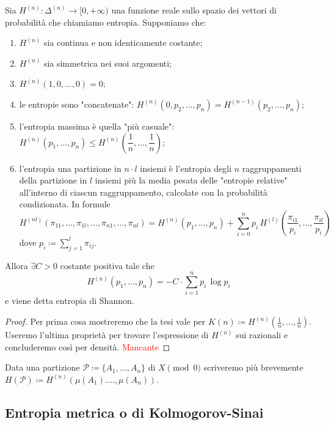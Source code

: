 \begin{thm}
    Sia $ H^{(n)} \colon \Delta^{(n)} \to [0, +\infty) $ una funzione reale sullo spazio dei vettori di probabilità che chiamiamo entropia. Supponiamo che:    \begin{enumerate}[label=(\roman*)]
        \item $ H^{(n)} $ sia continua e non identicamente costante;
        \item $ H^{(n)} $ sia simmetrica nei suoi argomenti;
        \item $ H^{(n)}(1, 0, \ldots, 0) = 0 $;
        \item le entropie sono "concatenate": $ H^{(n)}(0, p_2, \ldots, p_n) = H^{(n-1)}(p_2, \ldots, p_n) $;
        \item l'entropia massima è quella "più casuale": $ H^{(n)}(p_1, \ldots, p_n) \leq H^{(n)}\left(\dfrac{1}{n}, \ldots, \dfrac{1}{n}\right) $;
        \item l'entropia una partizione in $ n \cdot l $ insiemi è l'entropia degli $ n $ raggruppamenti della partizione in $ l $ insiemi più la media pesata delle "entropie relative" all'interno di ciascun raggruppamento, calcolate con la probabilità condizionata. In formule
        \[
            H^{(nl)}(\pi_{11}, \ldots, \pi_{1l}, \ldots, \pi_{n1}, \ldots, \pi_{nl}) = H^{(n)}(p_1, \ldots, p_n) + \sum_{i = 0}^{n} p_i \, H^{(l)} \left(\dfrac{\pi_{i1}}{p_i}, \ldots, \dfrac{\pi_{il}}{p_i}\right)
        \]
        dove $ p_i \coloneqq \sum_{j = 1}^{l} \pi_{ij} $.
    \end{enumerate}
    Allora $ \exists C > 0 $ costante positiva tale che
    \[
        H^{(n)}(p_1, \ldots, p_n) = -C \cdot \sum_{i = 1}^{n} p_i \, \log{p_i}
    \]
    e viene detta entropia di Shannon.
\end{thm}
\begin{proof}
    Per prima cosa mostreremo che la tesi vale per $ K(n) \coloneqq H^{(n)}\left(\frac{1}{n}, \ldots, \frac{1}{n}\right) $. Useremo l'ultima proprietà per trovare l'espressione di $ H^{(n)} $ sui razionali e concluderemo così per densità. \textcolor{red}{Mancante}
\end{proof}

Data una partizione $ \mathcal{P} \coloneqq \{A_1, \ldots, A_n\} $ di $ X \pmod{0} $ scriveremo più brevemente $ H(\mathcal{P}) \coloneqq H^{(n)}(\mu(A_1). \ldots, \mu(A_n)) $.

\subsection{Entropia metrica o di Kolmogorov-Sinai}

